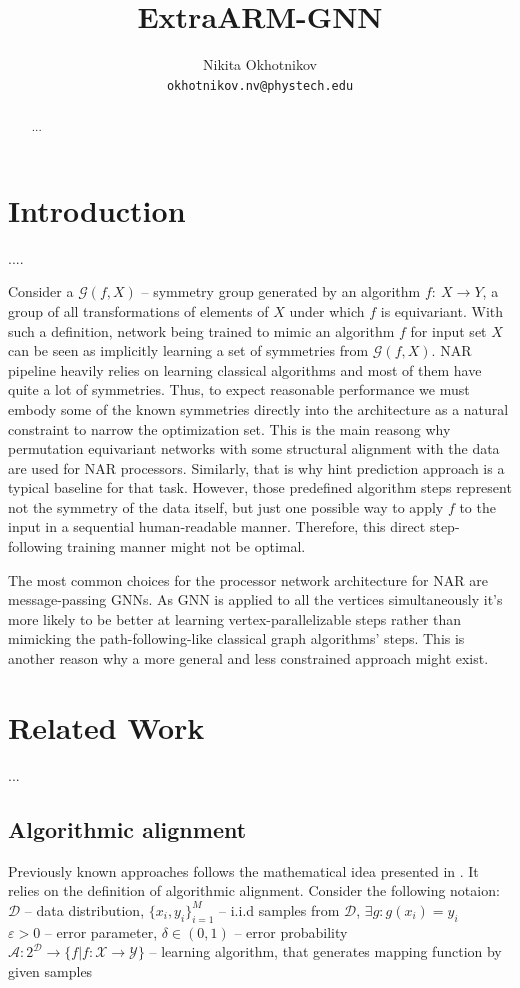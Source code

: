 \documentclass{article}
\title{ExtraARM-GNN}
\author{Nikita Okhotnikov\\
	\texttt{okhotnikov.nv@phystech.edu} \\
}
\date{}
\begin{document}
\maketitle
\begin{abstract}
    ...
\end{abstract}

\section{Introduction}
    ....

     Consider a $\mathcal{G}(f, X)$ -- symmetry group generated
    by an algorithm $f:~ X\to Y$, a group of all transformations of elements of $X$ under which $f$ is equivariant. With such a definition, network being trained to 
    mimic an algorithm $f$ for input set $X$ can be seen as implicitly learning a set of symmetries from $\mathcal{G}(f, X)$. NAR \cite{velivckovic2021neural} 
    pipeline heavily relies on learning classical algorithms and most of them have quite a lot of symmetries. Thus, to expect reasonable performance we must embody 
    some of the known symmetries directly into the architecture as a natural constraint to narrow the optimization set. This is the main reasong why 
    permutation equivariant networks with some structural alignment with the data are used for NAR processors. 
    Similarly, that is why hint prediction approach is a typical baseline for that task. However, those predefined algorithm steps represent not the symmetry
    of the data itself, but just one possible way to apply $f$ to the input in a sequential human-readable manner. Therefore, this direct step-following 
    training manner might not be optimal. 

    The most common choices for the processor network architecture for NAR are message-passing GNNs. As GNN is applied to all the vertices simultaneously 
    it's more likely to be better at learning vertex-parallelizable steps rather than mimicking the path-following-like classical graph algorithms' steps. 
    This is another reason why a more general and less constrained approach might exist. 

\section{Related Work}
    ...
\subsection{Algorithmic alignment}
    Previously known approaches follows the mathematical idea presented in \cite{xu2019can}.
    It relies on the definition of algorithmic alignment. Consider the following notaion: \\
    $\mathcal{D}$ -- data distribution, $\{x_i, y_i\}_{i=1}^M$ -- i.i.d samples from $\mathcal{D}$, $\exists g: g(x_i) = y_i$\\ 
	$\varepsilon > 0$ -- error parameter, $\delta \in (0,1)$ -- error probability\\
	$\mathcal{A}: 2^\mathcal{D} \to \{f| f: \mathcal{X}\to \mathcal{Y}\}$ -- learning algorithm, that generates mapping function by given samples\\
\end{document}
